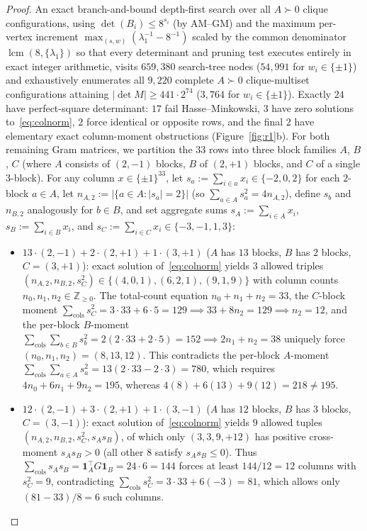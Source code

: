 \documentclass[11pt]{article}
\theoremstyle{remark}
\newcommand{\Z}{\mathbb{Z}}
\begin{document}
\begin{proof}
An exact branch-and-bound depth-first search over all $A \succ 0$ clique configurations, using $\det(B_i) \le 8^{s_i}$ (by AM--GM) and the maximum per-vertex increment $\max_{(s, w)} (\lambda_1^{-1} - 8^{-1})$ scaled by the common denominator $\operatorname{lcm}(8, \{\lambda_1\})$ so that every determinant and pruning test executes entirely in exact integer arithmetic, visits $659{,}380$ search-tree nodes ($54{,}991$ for $w_i \in \{\pm 1\}$) and exhaustively enumerates all $9{,}220$ complete $A \succ 0$ clique-multiset configurations attaining $|\det M| \ge 441 \cdot 2^{74}$ ($3{,}764$ for $w_i \in \{\pm 1\}$). Exactly $24$ have perfect-square determinant: $17$ fail Hasse--Minkowski, $3$ have zero solutions to~\eqref{eq:colnorm}, $2$ force identical or opposite rows, and the final $2$ have elementary exact column-moment obstructions (Figure~\ref{fig:r1}b). For both remaining Gram matrices, we partition the $33$ rows into three block families $A$, $B$, $C$ (where $A$ consists of $(2, -1)$ blocks, $B$ of $(2, +1)$ blocks, and $C$ of a single $3$-block). For any column $x \in \{\pm 1\}^{33}$, let $s_a := \sum_{i \in a} x_i \in \{-2, 0, 2\}$ for each $2$-block $a \in A$, let $n_{A,2} := |\{a \in A : |s_a| = 2\}|$ (so $\sum_{a \in A} s_a^2 = 4 n_{A,2}$), define $s_b$ and $n_{B,2}$ analogously for $b \in B$, and set aggregate sums $s_A := \sum_{i \in A} x_i$, $s_B := \sum_{i \in B} x_i$, and $s_C := \sum_{i \in C} x_i \in \{-3, -1, 1, 3\}$:
\begin{itemize}[leftmargin=*,topsep=1pt,itemsep=1pt]
\item $13\cdot(2,-1) + 2\cdot(2,+1) + 1\cdot(3,+1)$ ($A$ has $13$ blocks, $B$ has $2$ blocks, $C = (3, +1)$): exact solution of~\eqref{eq:colnorm} yields $3$ allowed triples $(n_{A,2}, n_{B,2}, s_C^2) \in \{(4,0,1), (6,2,1), (9,1,9)\}$ with column counts $n_0, n_1, n_2 \in \Z_{\ge 0}$. The total-count equation $n_0 + n_1 + n_2 = 33$, the $C$-block moment $\sum_{\mathrm{cols}} s_C^2 = 3 \cdot 33 + 6 \cdot 5 = 129 \implies 33 + 8 n_2 = 129 \implies n_2 = 12$, and the per-block $B$-moment $\sum_{\mathrm{cols}} \sum_{b \in B} s_b^2 = 2(2 \cdot 33 + 2 \cdot 5) = 152 \implies 2 n_1 + n_2 = 38$ uniquely force $(n_0, n_1, n_2) = (8, 13, 12)$. This contradicts the per-block $A$-moment $\sum_{\mathrm{cols}} \sum_{a \in A} s_a^2 = 13(2 \cdot 33 - 2 \cdot 3) = 780$, which requires $4 n_0 + 6 n_1 + 9 n_2 = 195$, whereas $4(8) + 6(13) + 9(12) = 218 \ne 195$.
\item $12\cdot(2,-1) + 3\cdot(2,+1) + 1\cdot(3,-1)$ ($A$ has $12$ blocks, $B$ has $3$ blocks, $C = (3, -1)$): exact solution of~\eqref{eq:colnorm} yields $9$ allowed tuples $(n_{A,2}, n_{B,2}, s_C^2, s_A s_B)$, of which only $(3, 3, 9, +12)$ has positive cross-moment $s_A s_B > 0$ (all other $8$ satisfy $s_A s_B \le 0$). Thus $\sum_{\mathrm{cols}} s_A s_B = \mathbf{1}_A^\top G \mathbf{1}_B = 24 \cdot 6 = 144$ forces at least $144/12 = 12$ columns with $s_C^2 = 9$, contradicting $\sum_{\mathrm{cols}} s_C^2 = 3 \cdot 33 + 6(-3) = 81$, which allows only $(81 - 33)/8 = 6$ such columns.\qedhere
\end{itemize}
\end{proof}
\end{document}
